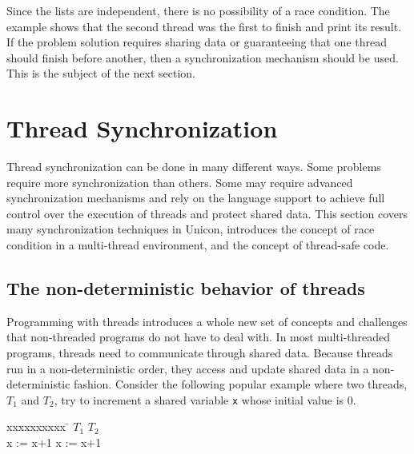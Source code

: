 Since the lists are independent, there is no possibility of a race
condition. The example shows that the second thread was the first to
finish and print its result. If the problem solution requires sharing
data or guaranteeing that one thread should finish before another,
then a synchronization mechanism should be used. This is the subject
of the next section.


\section{Thread Synchronization}

Thread synchronization can be done in many different ways. Some
problems require more synchronization than others. Some may require
advanced synchronization mechanisms and rely on the language support
to achieve full control over the execution of threads and protect
shared data. This section covers many synchronization techniques in
Unicon, introduces the concept of race condition in a multi-thread
environment, and the concept of thread-safe code.

\subsection*{The non-deterministic behavior of threads}

Programming with threads introduces a whole new set of concepts and
challenges that non-threaded programs do not have to deal with.  In
most multi-threaded programs, threads need to communicate through
shared data. Because threads run in a non-deterministic order, they
access and update shared data in a non-deterministic fashion.
Consider the following popular example where two threads, $T_1$ and
$T_2$, try to increment a shared variable \texttt{x} whose initial
value is 0.

\begin{tabbing}
  xxxxxxxxxx \= \kill
  $T_1$ \> $T_2$ \\
  x := x+1 \> x := x+1
\end{tabbing}

